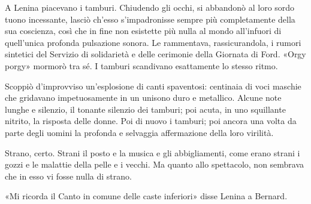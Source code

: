 \documentclass[
a5paper, %
10pt, %
twoside, 
onecolumn, %
openany, %
]{memoir}
\begin{document}
A Lenina piacevano i tamburi. Chiudendo gli occhi, si abbandonò al loro sordo tuono incessante, lasciò ch’esso s’impadronisse sempre più completamente della sua coscienza, così che in fine non esistette più nulla al mondo all’infuori di quell’unica profonda pulsazione sonora. Le rammentava, rassicurandola, i rumori sintetici del Servizio di solidarietà e delle cerimonie della Giornata di Ford. «Orgy porgy» mormorò tra sé. I tamburi scandivano esattamente lo stesso ritmo.

Scoppiò d’improvviso un’esplosione di canti spaventosi: centinaia di voci maschie che gridavano impetuosamente in un unisono duro e metallico. Alcune note lunghe e silenzio, il tonante silenzio dei tamburi; poi acuta, in uno squillante nitrito, la risposta delle donne. Poi di nuovo i tamburi; poi ancora una volta da parte degli uomini la profonda e selvaggia affermazione della loro virilità.

Strano, certo. Strani il posto e la musica e gli abbigliamenti, come erano strani i gozzi e le malattie della pelle e i vecchi. Ma quanto allo spettacolo, non sembrava che in esso vi fosse nulla di strano.

«Mi ricorda il Canto in comune delle caste inferiori» disse Lenina a Bernard.
\end{document}
